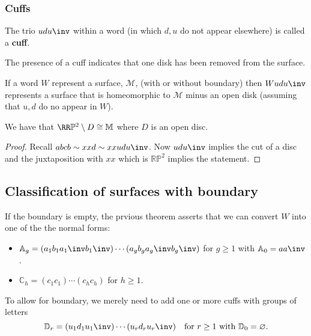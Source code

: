 \documentclass[12pt, a4paper]{article}
\begin{document}
\subsubsection{Cuffs}

\begin{definition}
    The trio \(udu\inv\) within a word (in which \(d,u\) do not appear elsewhere)  is called a \textbf{cuff}.
\end{definition}

\begin{mdnote}
    The presence of a cuff indicates that one disk has been removed from the surface.
\end{mdnote}

\begin{mdprop}
    If a word \(W\) represent a surface, \(\mathcal{M}\), (with or without boundary) then \(Wudu\inv\) represents a surface that is homeomorphic to \(\mathcal{M}\) minus an open disk (assuming that \(u,d\) do no appear in \(W\)).
\end{mdprop}

\begin{mdprop}
    We have that \(\RR\mathbb{P}^2 \setminus D \cong \mathbb{M}\) where \(D\) is an open disc.
\end{mdprop}

\begin{proof}
    Recall \(abcb \sim xxd \sim xxudu\inv\). Now \(udu\inv\) implies the cut of a disc and the juxtaposition with \(xx\) which is \(\mathbb{RP}^2\) implies the statement.
\end{proof}

\subsection{Classification of surfaces with boundary}

If the boundary is empty, the prvious theorem asserts that we can convert \(W\) into one of the the normal forms:
\begin{itemize}
    \item \(\mathbb{A}_g = (a_1b_1a_1\inv b_1\inv) \cdots (a_g b_g a_g\inv b_g\inv)\) for \(g \geq 1\) with \(\mathbb{A}_0=aa\inv\).
    \item \(\mathbb{C}_h = (c_1c_1)\cdots (c_hc_h)\) for \(h\geq 1\).
\end{itemize}
To allow for boundary, we merely need to add one or more cuffs with groups of letters 
\[\mathbb{D}_r = (u_1d_1u_1\inv) \cdots (u_r d_r u_r\inv) \quad \text{for } r \geq 1 \text{ with } \mathbb{D}_0=\varnothing.\]
\end{document}
